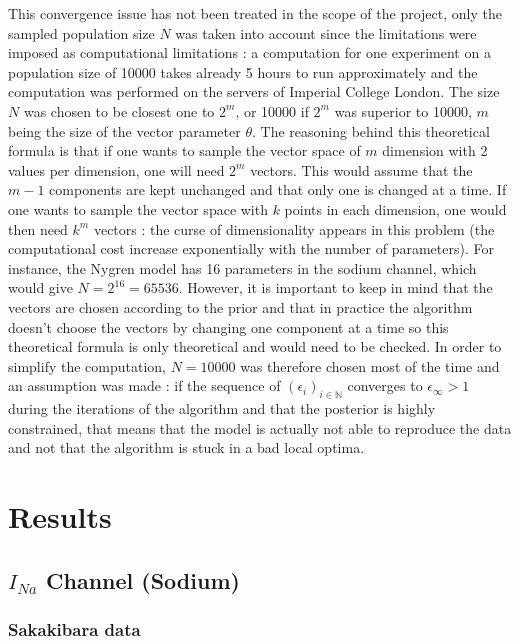\documentclass[11pt]{report}
\begin{document}
This convergence issue has not been treated in the scope of the project, only the sampled population size $N$ was taken into account since the limitations were imposed as computational limitations : a computation for one experiment on a population size of 10000 takes already 5 hours to run approximately and the computation was performed on the servers of Imperial College London. The size $N$ was chosen to be closest one to $2^m$, or 10000 if $2^m$ was superior to 10000, $m$ being the size of the vector parameter $\theta$. The reasoning behind this theoretical formula is that if one wants to sample the vector space of $m$ dimension with 2 values per dimension, one will need $2^m$ vectors. This would assume that the $m-1$ components are kept unchanged and that only one is changed at a time. If one wants to sample the vector space with $k$ points in each dimension, one would then need $k^m$ vectors : the curse of dimensionality appears in this problem (the computational cost increase exponentially with the number of parameters). For instance, the Nygren \cite{Nygren1998} model has 16 parameters in the sodium channel, which would give $N = 2^{16} = 65536$. However, it is important to keep in mind that the vectors are chosen according to the prior and that in practice the algorithm doesn't choose the vectors by changing one component at a time so this theoretical formula is only theoretical and would need to be checked. In order to simplify the computation, $N=10000$ was therefore chosen most of the time and an assumption was made : if the sequence of $(\epsilon_i)_{i \in \mathbb{N}}$ converges to $\epsilon_{\infty}>1$ during the iterations of the algorithm and that the posterior is highly constrained, that means that the model is actually not able to reproduce the data and not that the algorithm is stuck in a bad local optima. 


\chapter{Results}

\section{$I_{Na}$ Channel (Sodium)}

\subsection{Sakakibara \cite{Sakakibara1992} data}
\end{document}
